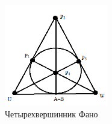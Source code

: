 \begin{figure}[H]
  \begin{center}
    \includegraphics[width=0.4\textwidth]{authors/Stepanuk-1-fig-2.png}
  \end{center}
  \caption{Четырехвершинник Фано}
  \label{fig:Stepanuk-1-fig-2}
\end{figure}
